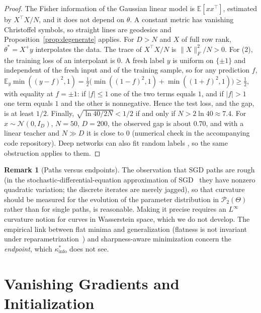 \documentclass[11pt,reqno]{amsart}
\theoremstyle{definition}
\newtheorem{remark}[theorem]{Remark}
\newcommand{\E}{\mathbb{E}}
\numberwithin{equation}{section}
\begin{document}
\begin{proof}
The Fisher information of the Gaussian linear model is $\E[x x^\top]$, estimated by $X^\top X/N$, and it does not depend on $\theta$. A constant metric has vanishing Christoffel symbols, so straight lines are geodesics and Proposition~\ref{prop:degenerate} applies. For $D > N$ and $X$ of full row rank, $\theta^* = X^+ y$ interpolates the data. The trace of $X^\top X/N$ is $\|X\|_F^2/N > 0$.
For (2), the training loss of an interpolant is $0$. A fresh label $y$ is uniform on $\{\pm1\}$ and independent of the fresh input and of the training sample, so for any prediction $f$, $\E_y \min((y-f)^2, 1) = \frac12\big(\min((1-f)^2,1) + \min((1+f)^2,1)\big) \ge \frac12$, with equality at $f = \pm1$: if $|f| \le 1$ one of the two terms equals $1$, and if $|f| > 1$ one term equals $1$ and the other is nonnegative. Hence the test loss, and the gap, is at least $1/2$. Finally, $\sqrt{\ln 40/2N} < 1/2$ if and only if $N > 2\ln 40 \approx 7.4$. For $x \sim \mathcal{N}(0, I_D)$, $N = 50$, $D = 200$, the observed gap is about $0.70$, and with a linear teacher and $N \gg D$ it is close to $0$ (numerical check in the accompanying code repository). Deep networks can also fit random labels \cite{zhang2021}, so the same obstruction applies to them.
\end{proof}

\begin{remark}[Paths versus endpoints]
The observation that SGD paths are rough (in the stochastic-differential-equation approximation of SGD~\cite{li2017sme} they have nonzero quadratic variation; the discrete iterates are merely jagged), so that curvature should be measured for the evolution of the parameter distribution in $\mathcal{P}_2(\Theta)$ rather than for single paths, is reasonable. Making it precise requires an $L^\infty$ curvature notion for curves in Wasserstein space, which we do not develop. The empirical link between flat minima and generalization \cite{hochreiter1997, keskar2016, dziugaite2017} (flatness is not invariant under reparametrization~\cite{dinh2017sharp}) and sharpness-aware minimization \cite{foret2020} concern the \emph{endpoint}, which $\kappa^*_{\mathrm{info}}$ does not see.
\end{remark}

\section{Vanishing Gradients and Initialization}
\end{document}
